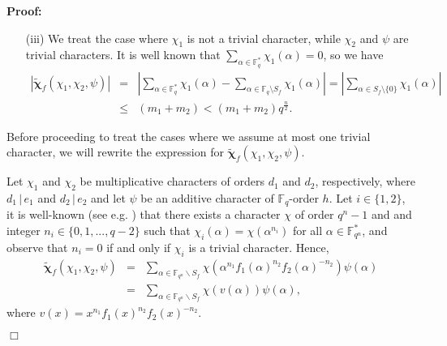 \documentclass[12pt]{article}
\newenvironment{proof}{\noindent \textbf{Proof: }}{\hfill
$\Box$  \vspace{1ex}}
\newcommand{\F}{\mathbb{F}}
\def\bchi{\boldsymbol{\chi}}
\begin{document}
\begin{proof}
\begin{enumerate}
\item[(iii)] We treat the case where $\chi_1$ is not a trivial character, while 
$\chi_2$ and $\psi$ are trivial characters. It is well known that 
$\sum_{\alpha \in \mathbb{F}_q^*}\chi_1(\alpha)= 0$, so we have 
\begin{eqnarray}
|\tilde{\bchi}_f(\chi_{1},\chi_{2},\psi) | & =&
\left| \sum_{\alpha \in \mathbb{F}_q^*}\chi_1(\alpha)
-
\sum_{\alpha\in\mathbb{F}_{q}\setminus S_f}\chi_1(\alpha)
\right| =
\left| \sum_{\alpha \in S_f\setminus\{0\}}\chi_1(\alpha) \right|
\nonumber \\
& \leq &(m_1+m_2) < (m_1+m_2)q^{\frac{n}{2}}.
\nonumber
\end{eqnarray}
\end{enumerate}


Before proceeding to treat the cases where we assume at most one trivial 
character, we will rewrite the expression for 
$\tilde{\bchi}_f(\chi_{1},\chi_{2},\psi)$. 

Let $\chi_1$ and $\chi_2$ be multiplicative characters of orders $d_1$ and
$d_2$, respectively, where $d_1 \, |\, e_1$ and $d_2 \, | \, e_2$
and let $\psi$ be an additive character of $\F_q$-order $h$.
Let $i \in \{1, 2\}$,
it is
well-known (see e.g. \cite[Thm.\ 5.8]{LN}) that there exists a character
$\chi$  of order $q^n -1$ and and integer
$n_i \in\{0,1,...,q-2\}$ such that $\chi_{i}(\alpha)=\chi(\alpha^{n_i})$
for all $\alpha \in \mathbb{F}_{q^n}^*$, and observe that
$n_i=0$ if and only if $\chi_i$ is a trivial character. Hence,
\begin{eqnarray}
\tilde{\bchi}_f(\chi_{1},\chi_{2},\psi) & = &
\sum_{\alpha\in\F_{q^n}\backslash S_f}
\chi(\alpha^{n_1}f_1(\alpha)^{n_2}f_2(\alpha)^{-n_2})\psi(\alpha)
 \nonumber \\
& = &
\sum_{\alpha\in\F_{q^n}\backslash S_f}\chi(v(\alpha))\psi(\alpha), 
\nonumber
\end{eqnarray}
where $v(x)=x^{n_1}f_1(x)^{n_2}f_2(x)^{-n_2}$.


\end{proof}
\end{document}
